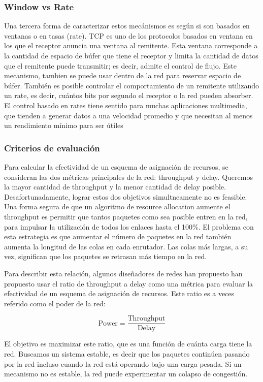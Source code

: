 \subsubsection*{Window vs Rate}
Una tercera forma de caracterizar estos mecánismos es según si son basados en ventanas o en tasas (rate). TCP es uno de los protocolos basados en ventana en los que el receptor anuncia una ventana al remitente. Esta ventana corresponde a la cantidad de espacio de búfer que tiene el receptor y limita la cantidad de datos que el remitente puede transmitir; es decir, admite el control de flujo. Este mecanismo, tambien se puede usar dentro de la red para reservar espacio de búfer. También es posible controlar el comportamiento de un remitente utilizando un rate, es decir, cuántos bits por segundo el receptor o la red pueden absorber. El control basado en rates tiene sentido para muchas aplicaciones multimedia, que tienden a generar datos a una velocidad promedio y que necesitan al menos un rendimiento mínimo para ser útiles

\subsubsection{Criterios de evaluación}
Para calcular la efectividad de un esquema de asignación de recursos, se consideran las dos métricas principales de la red: throughput y delay. Queremos la mayor cantidad de throughput y la menor cantidad de delay posible. Desafortunadamente, lograr estos dos objetivos simultneamente no es feasible. Una forma segura de que un algoritmo de resource allocation aumente el throughput es permitir que tantos paquetes como sea posible entren en la red, para impulsar la utilización de todos los enlaces hasta el 100\%. El problema con esta estrategia es que aumentar el número de paquetes en la red también aumenta la longitud de las colas en cada enrutador. Las colas más largas, a su vez, significan que los paquetes se retrasan más tiempo en la red.

Para describir esta relación, algunos diseñadores de redes han propuesto han propuesto usar el ratio de throughput a delay como una métrica para evaluar la efectividad de un esquema de asignación de recursos. Este ratio es a veces referido como el poder de la red:

\begin{equation}
  \text{Power} = \frac{\text{Throughput}}{\text{Delay}} 
\end{equation}

El objetivo es maximizar este ratio, que es una función de cuánta carga tiene la red. Buscamos un sistema estable, es decir que los paquetes continúen pasando por la red incluso cuando la red está operando bajo una carga pesada. Si un mecanismo no es estable, la red puede experimentar un colapso de congestión.

